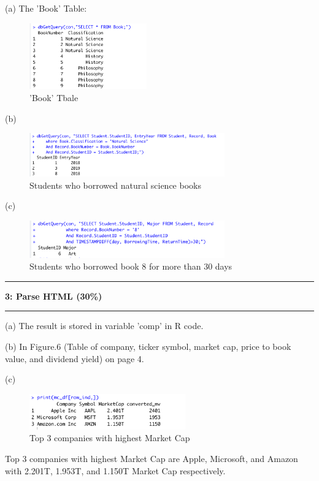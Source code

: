 \documentclass[11pt]{article}
\newcommand\question[2]{\vspace{.25in}\hrule\textbf{#1: #2}\vspace{.5em}\hrule\vspace{.10in}}
\begin{document}
(a) The 'Book' Table:
\begin{figure}[H]
    \centering
    \includegraphics[width=0.45\textwidth]{figures/Q2.1.png}
    \caption{'Book' Tbale}
\end{figure}
\newpage
(b) 
\begin{figure}[H]
    \centering
    \includegraphics[width=0.75\textwidth]{figures/Q2.2.png}
    \caption{Students who borrowed natural science books}
\end{figure}
(c)
\begin{figure}[H]
    \centering
    \includegraphics[width=0.75\textwidth]{figures/Q2.3.png}
    \caption{Students who borrowed book 8 for more than 30 days}
\end{figure}


\question{3}{Parse HTML (30\%)}
(a) The result is stored in variable 'comp' in R code.

(b) In Figure.6 (Table of company, ticker symbol, market cap, price to book value, and dividend yield) on page 4.

(c)
\begin{figure}[H]
    \centering
    \includegraphics[width=0.6\textwidth]{figures/Q3c.png}
    \caption{Top 3 companies with highest Market Cap}
\end{figure}
Top 3 companies with highest Market Cap are Apple, Microsoft, and Amazon with 2.201T, 1.953T, and 1.150T Market Cap respectively.
\end{document}
